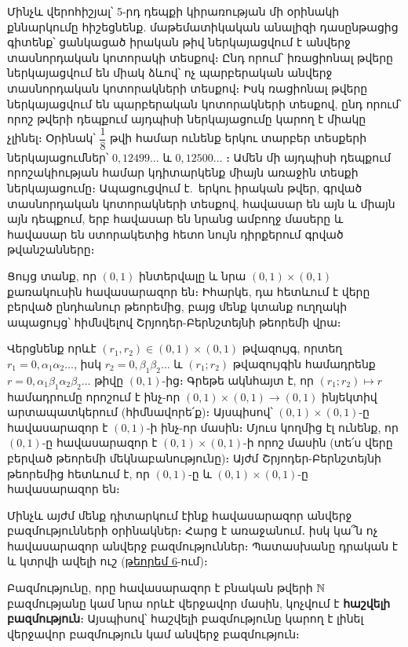 \documentclass[./main.tex]{subfiles}
\begin{document}
Մինչև վերոհիշյալ՝ 5-րդ դեպքի կիրառության մի օրինակի քննարկումը հի\-շեց\-նենք. մաթեմատիկական անալիզի դասընթացից գիտենք՝ ցանկացած իրական թիվ ներ\-կա\-յաց\-վում է անվերջ տասնորդական կոտորակի տեսքով։ Ընդ որում՝ իռացիո\-նալ թվերը ներկայացվում են միակ ձևով՝ ոչ պարբերական անվերջ տասնորդական կոտորակների տեսքով։ Իսկ ռացիոնալ թվերը ներկայացվում են պարբերական կո\-տո\-րակների տեսքով, ընդ որում՝ որոշ թվերի դեպքում այդպիսի ներկայացումը կարող է միակը չլինել։ Օրինակ՝ $\dfrac{1}{8}$ թվի համար ունենք երկու տարբեր տեսքերի ներկայացում\-ներ՝ $0{,}12499\dots$ և $0{,}12500\dots$ ։ Ամեն մի այդպիսի դեպքում ո\-րո\-շա\-կիութ\-յան համար կդիտարկենք միայն առաջին տեսքի ներկայացումը։ Ապացուցվում է.\ երկու իրական թվեր, գրված տասնորդական կոտորակների տեսքով, հավասար են այն և միայն այն դեպքում, երբ հավասար են նրանց ամբողջ մասերը և հավասար են ստորակետից հետո նույն դիրքերում գրված թվանշանները։
\begin{example}\label{ch3ex4}
Ցույց տանք, որ $(0,1)$ ինտերվալը և նրա $(0,1)\times(0,1)$ քառակուսին հավասարազոր են։ Իհարկե, դա հետևում է վերը բերված ընդհանուր թեորեմից, բայց մենք կտանք ուղղակի ապացույց՝ հիմնվելով Շրյոդեր-Բերնշտեյնի թեորեմի վրա։ 

\par Վերցնենք որևէ $(r_1, r_2) \in (0,1)\times(0,1)$ թվազույգ, որտեղ $r_1= 0{,}\alpha_1\alpha_2\dots$, իսկ $r_2= 0{,}\beta_1\beta_2\dots$ և $(r_1;r_2)$ թվազույգին համադրենք $r=0{,}\alpha_1\beta_1\alpha_2\beta_2\dots$ թիվը $(0,1)$-ից։ Գրեթե ակնհայտ է, որ ${(r_1;r_2) \mapsto r}$ համադրումը որոշում է ինչ-որ $(0,1)\times(0,1)\rightarrow (0,1)$ ինյեկտիվ արտապատկերում (հիմնավորե՛ք)։ Այսպիսով՝ $(0,1)\times(0,1)$-ը հավա\-սա\-րազոր է $(0,1)$-ի ինչ-որ մասին։ Մյուս կողմից էլ ունենք, որ $(0,1)$-ը  հավասարազոր է $(0,1)\times(0,1)$-ի որոշ մասին (տե՛ս վերը բերված թեորեմի մեկնաբանությունը)։ Այժմ Շրյոդեր-Բերնշտեյնի թեորեմից հետևում է, որ $(0,1)$-ը և $(0,1)\times(0,1)$-ը հավասարա\-զոր են։
\end{example}

\par Մինչև այժմ մենք դիտարկում էինք հավասարազոր անվերջ բազմությունների օրինակներ։ Հարց է առաջանում․ իսկ կա՞ն ոչ հավասարազոր անվերջ բազմություն\-ներ։ Պատասխանը դրական է և կտրվի ավելի ուշ (\hyperref[թեորեմ 6]{թեորեմ 6}-ում)։
\begin{definition}
Բազմությունը, որը հավասարազոր է բնական թվերի $\mathbb{N}$ բազ\-մու\-թյանը կամ նրա որևէ վերջավոր մասին, կոչվում է \textbf{հաշվելի բազմություն}։ Այս\-պի\-սով՝ հաշվելի բազ\-մութ\-յունը կարող է լինել վերջավոր բազմություն կամ անվերջ բազմություն։
\end{definition}
\end{document}
